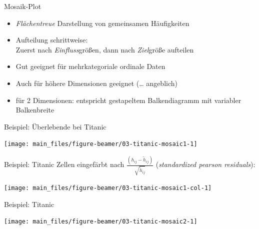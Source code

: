 \documentclass[
  10pt,
  ignorenonframetext,
]{beamer}
\providecommand{\tightlist}{%
  \setlength{\itemsep}{0pt}\setlength{\parskip}{0pt}}
\begin{document}
\begin{frame}{Mosaik-Plot}
\label{mosaik-plot}
\begin{itemize}
\tightlist
\item
  \emph{Flächentreue} Darstellung von gemeinsamen Häufigkeiten
\item
  Aufteilung schrittweise:\\
  Zuerst nach \emph{Einfluss}größen, dann nach \emph{Ziel}größe
  aufteilen
\item
  Gut geeignet für mehrkategoriale ordinale Daten
\item
  Auch für höhere Dimensionen geeignet (\ldots{} angeblich)
\item
  für 2 Dimensionen: entspricht gestapeltem Balkendiagramm mit variabler
  Balkenbreite
\end{itemize}

\end{frame}

\begin{frame}{Beispiel: Überlebende bei Titanic}
\label{beispiel-uxfcberlebende-bei-titanic}
\scriptsize

\begin{center}\texttt{[image: main\_files/figure-beamer/03-titanic-mosaic1-1]} \end{center}

\normalsize
\end{frame}

\begin{frame}{Beispiel: Titanic}
\label{beispiel-titanic-3}
Zellen eingefärbt nach \(\frac{\left(h_{ij}-\tilde h_{ij}\right)}
{\sqrt{\tilde h_{ij}}}\) (\emph{standardized pearson residuals}):
\scriptsize

\begin{center}\texttt{[image: main\_files/figure-beamer/03-titanic-mosaic1-col-1]} \end{center}

\normalsize
\end{frame}

\begin{frame}{Beispiel: Titanic}
\label{beispiel-titanic-4}
\scriptsize

\begin{center}\texttt{[image: main\_files/figure-beamer/03-titanic-mosaic2-1]} \end{center}

\normalsize
\end{frame}
\end{document}
